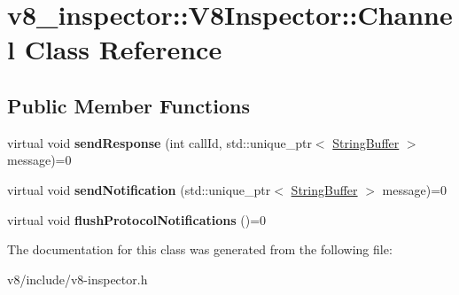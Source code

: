 \hypertarget{classv8__inspector_1_1V8Inspector_1_1Channel}{}\section{v8\+\_\+inspector\+:\+:V8\+Inspector\+:\+:Channel Class Reference}
\label{classv8__inspector_1_1V8Inspector_1_1Channel}
\subsection*{Public Member Functions}
\begin{DoxyCompactItemize}
\item 
\mbox{\label{classv8__inspector_1_1V8Inspector_1_1Channel_ad83740738d43c5ecadca3e3edfe44e65}} 
virtual void {\bfseries send\+Response} (int call\+Id, std\+::unique\+\_\+ptr$<$ \mbox{\hyperlink{classv8__inspector_1_1StringBuffer}{String\+Buffer}} $>$ message)=0
\item 
\mbox{\label{classv8__inspector_1_1V8Inspector_1_1Channel_ab710f81284b5c7a2b75f7b187ddf9ca1}} 
virtual void {\bfseries send\+Notification} (std\+::unique\+\_\+ptr$<$ \mbox{\hyperlink{classv8__inspector_1_1StringBuffer}{String\+Buffer}} $>$ message)=0
\item 
\mbox{\label{classv8__inspector_1_1V8Inspector_1_1Channel_ac30623e11f5b55b76d8a9cc3c007b191}} 
virtual void {\bfseries flush\+Protocol\+Notifications} ()=0
\end{DoxyCompactItemize}


The documentation for this class was generated from the following file\+:\begin{DoxyCompactItemize}
\item 
v8/include/v8-\/inspector.\+h\end{DoxyCompactItemize}
